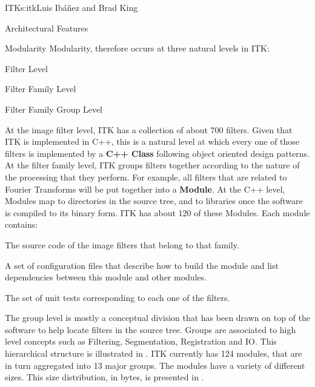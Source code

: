 \begin{aosachapter}{ITK}{s:itk}{Luis Ib\'{a}\~{n}ez and Brad King}
\begin{aosasect1}{Architectural Features}
\begin{aosasect2}{Modularity}
Modularity, therefore occurs at three natural levels in ITK:

\begin{aosaitemize}
\item Filter Level
\item Filter Family Level
\item Filter Family Group Level
\end{aosaitemize}

At the image filter level, ITK has a collection of about 700 filters. Given
that ITK is implemented in C++, this is a natural level at which every one of
those filters is implemented by a \textbf{C++ Class} following object
oriented design patterns.  At the filter family level, ITK groups filters together
according to the nature of the processing that they perform. For example, all
filters that are related to Fourier Transforms will be put together into a
\textbf{Module}.  At the C++ level, Modules map to directories in the
source tree, and to libraries once the software is compiled to its
binary form. ITK has about 120 of these Modules. Each module contains:

\begin{aosaenumerate}

\item The source code of the image filters that belong to that family.

\item A set of configuration files that describe how to build the module and
list dependencies between this module and other modules.

\item The set of unit tests corresponding to each one of the filters.

\end{aosaenumerate}


The group level is mostly a conceptual division that has been drawn on top of
the software to help locate filters in the source tree. Groups are associated
to high level concepts such as Filtering, Segmentation, Registration and IO.
This hierarchical structure is illustrated in
.  ITK currently has 124 modules, that are
in turn aggregated into 13 major groups.  The modules have a variety of
different sizes. This size distribution, in bytes, is presented in
.


\end{aosasect2}
\end{aosasect1}
\end{aosachapter}
